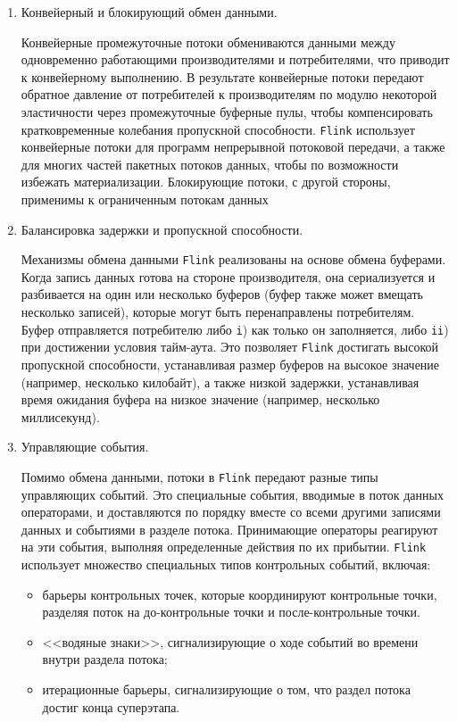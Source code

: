 \begin{enumerate}
  \item Конвейерный и блокирующий обмен данными.

    Конвейерные промежуточные потоки обмениваются данными между одновременно работающими производителями и потребителями, что приводит к конвейерному выполнению. 
    В результате конвейерные потоки передают обратное давление от потребителей к производителям по модулю некоторой эластичности через промежуточные буферные пулы, чтобы компенсировать кратковременные колебания пропускной способности. 
    \texttt{Flink} использует конвейерные потоки для программ непрерывной потоковой передачи, а также для многих частей пакетных потоков данных, чтобы по возможности избежать материализации. 
    Блокирующие потоки, с другой стороны, применимы к ограниченным потокам данных
  \item Балансировка задержки и пропускной способности.

    Механизмы обмена данными \texttt{Flink} реализованы на основе обмена буферами. 
    Когда запись данных готова на стороне производителя, она сериализуется и разбивается на один или несколько буферов (буфер также может вмещать несколько записей), которые могут быть перенаправлены потребителям. 
    Буфер отправляется потребителю либо \texttt{i}) как только он заполняется, либо \texttt{ii}) при достижении условия тайм-аута. 
    Это позволяет \texttt{Flink} достигать высокой пропускной способности, устанавливая размер буферов на высокое значение (например, несколько килобайт), а также низкой задержки, устанавливая время ожидания буфера на низкое значение (например, несколько миллисекунд).
  \item Управляющие события.

    Помимо обмена данными, потоки в \texttt{Flink} передают разные типы управляющих событий. 
    Это специальные события, вводимые в поток данных операторами, и доставляются по порядку вместе со всеми другими записями данных и событиями в разделе потока. 
    Принимающие операторы реагируют на эти события, выполняя определенные действия по их прибытии. 
    \texttt{Flink} использует множество специальных типов контрольных событий, включая:
    \begin{itemize}
      \item барьеры контрольных точек, которые координируют контрольные точки, разделяя поток на до-контрольные точки и после-контрольные точки.
      \item <<водяные знаки>>, сигнализирующие о ходе событий во времени внутри раздела потока;
      \item итерационные барьеры, сигнализирующие о том, что раздел потока достиг конца суперэтапа.
    \end{itemize}
\end{enumerate}

